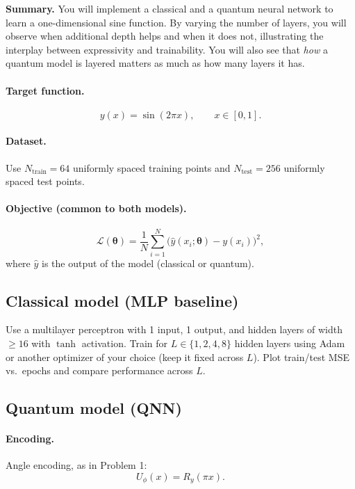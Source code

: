 \documentclass[11pt]{article}
\newenvironment{summary}{\par\noindent\textbf{Summary.} }{\par}
\begin{document}
\begin{summary}
You will implement a classical and a quantum neural network to learn a one-dimensional sine function.
By varying the number of layers, you will observe when additional depth helps and when it does not, illustrating the interplay between expressivity and trainability. You will also see that \emph{how} a quantum model is layered matters as much as how many layers it has.
\end{summary}

\paragraph{Target function.}
\[
y(x) = \sin(2\pi x), \qquad x\in[0,1].
\]

\paragraph{Dataset.}
Use $N_{\text{train}}=64$ uniformly spaced training points and $N_{\text{test}}=256$ uniformly spaced test points.

\paragraph{Objective (common to both models).}
\[
\mathcal{L}(\boldsymbol{\theta}) = \frac{1}{N}\sum_{i=1}^N \big(\hat{y}(x_i;\boldsymbol{\theta}) - y(x_i)\big)^2,
\]
where $\hat{y}$ is the output of the model (classical or quantum).

\subsection*{Classical model (MLP baseline)}
Use a multilayer perceptron with 1 input, 1 output, and hidden layers of width $\ge 16$ with $\tanh$ activation.
Train for $L\in\{1,2,4,8\}$ hidden layers using Adam or another optimizer of your choice (keep it fixed across $L$).
Plot train/test MSE vs.\ epochs and compare performance across $L$.

\subsection*{Quantum model (QNN)}

\paragraph{Encoding.}
Angle encoding, as in Problem 1:
\[
U_\phi(x) = R_y(\pi x).
\]
\end{document}
